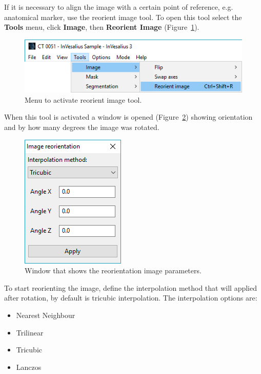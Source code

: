 If it is necessary to align the image with a certain point of reference, e.g. anatomical marker, use the reorient image tool. To open this tool select the \textbf{Tools} menu, click \textbf{Image}, then \textbf{Reorient Image} (Figure~\ref{fig:menu_img_reorient}).

\begin{figure}[!htb]
\centering
\includegraphics[scale=0.4]{../user_guide_figures/invesalius_screen/menu_img_reorient_en.png}
\caption{Menu to activate reorient image tool.}
\label{fig:menu_img_reorient}
\end{figure}

When this tool is activated a window is opened (Figure~\ref{fig:image_reorient_window}) showing orientation and by how many degrees the image was rotated.

\begin{figure}[!htb]
\centering
\includegraphics[scale=0.7]{../user_guide_figures/invesalius_screen/image_reorient_window_en.png}
\caption{Window that shows the reorientation image parameters.}
\label{fig:image_reorient_window}
\end{figure}

To start reorienting the image, define the interpolation method that will applied after rotation, by default is tricubic interpolation. The interpolation options are:

\begin{itemize}
	\item Nearest Neighbour
	\item Trilinear
	\item Tricubic
	\item Lanczos
\end{itemize}


